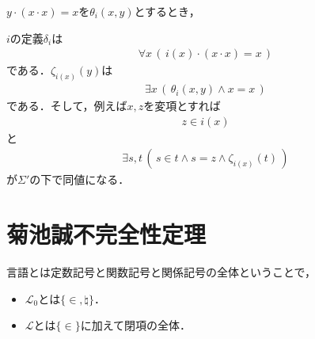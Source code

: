 \documentclass[a4j,10.5pt,oneside,openany]{jsbook}
\theoremstyle{mystyle}
\begin{document}
	\begin{screen}
		$y \cdot (x \cdot x) = x$を$\theta_{i}(x,y)$とするとき，
	\end{screen}
	
	$i$の定義$\delta_{i}$は
	\begin{align}
		\forall x\, \left(\, i(x) \cdot (x \cdot x) = x\, \right)
	\end{align}
	である．$\zeta_{i(x)}(y)$は
	\begin{align}
		\exists x\, \left(\, \theta_{i}(x,y) \wedge x = x\, \right)
	\end{align}
	である．そして，例えば$x,z$を変項とすれば
	\begin{align}
		z \in i(x)
	\end{align}
	と
	\begin{align}
		\exists s,t\, \left(\, s \in t \wedge s = z \wedge \zeta_{i(x)}(t)\, \right)
	\end{align}
	が$\Sigma'$の下で同値になる．
	
\section{菊池誠不完全性定理}
	言語とは定数記号と関数記号と関係記号の全体ということで，
	\begin{itemize}
		\item $\mathcal{L}_{0}$とは$\{\in,\natural\}$．
		\item $\mathcal{L}$とは$\{\in\}$に加えて閉項の全体．
	\end{itemize}
\end{document}
